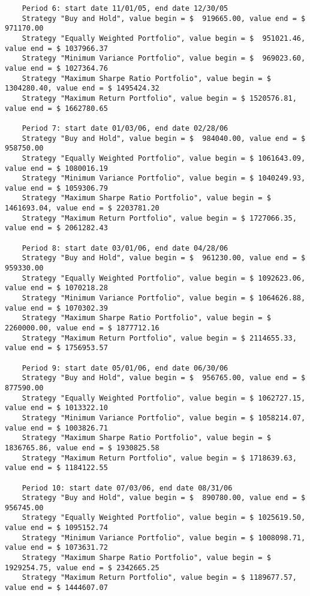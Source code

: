 \documentclass[english]{scrartcl}
\begin{document}
\begin{verbatim}
	Period 6: start date 11/01/05, end date 12/30/05
	Strategy "Buy and Hold", value begin = $  919665.00, value end = $  971170.00
	Strategy "Equally Weighted Portfolio", value begin = $  951021.46, value end = $ 1037966.37
	Strategy "Minimum Variance Portfolio", value begin = $  969023.60, value end = $ 1027364.76
	Strategy "Maximum Sharpe Ratio Portfolio", value begin = $ 1304280.40, value end = $ 1495424.32
	Strategy "Maximum Return Portfolio", value begin = $ 1520576.81, value end = $ 1662780.65
	
	Period 7: start date 01/03/06, end date 02/28/06
	Strategy "Buy and Hold", value begin = $  984040.00, value end = $  958750.00
	Strategy "Equally Weighted Portfolio", value begin = $ 1061643.09, value end = $ 1080016.19
	Strategy "Minimum Variance Portfolio", value begin = $ 1040249.93, value end = $ 1059306.79
	Strategy "Maximum Sharpe Ratio Portfolio", value begin = $ 1461693.04, value end = $ 2203781.20
	Strategy "Maximum Return Portfolio", value begin = $ 1727066.35, value end = $ 2061282.43
	
	Period 8: start date 03/01/06, end date 04/28/06
	Strategy "Buy and Hold", value begin = $  961230.00, value end = $  959330.00
	Strategy "Equally Weighted Portfolio", value begin = $ 1092623.06, value end = $ 1070218.28
	Strategy "Minimum Variance Portfolio", value begin = $ 1064626.88, value end = $ 1070302.39
	Strategy "Maximum Sharpe Ratio Portfolio", value begin = $ 2260000.00, value end = $ 1877712.16
	Strategy "Maximum Return Portfolio", value begin = $ 2114655.33, value end = $ 1756953.57
	
	Period 9: start date 05/01/06, end date 06/30/06
	Strategy "Buy and Hold", value begin = $  956765.00, value end = $  877590.00
	Strategy "Equally Weighted Portfolio", value begin = $ 1062727.15, value end = $ 1013322.10
	Strategy "Minimum Variance Portfolio", value begin = $ 1058214.07, value end = $ 1003826.71
	Strategy "Maximum Sharpe Ratio Portfolio", value begin = $ 1836765.86, value end = $ 1930825.58
	Strategy "Maximum Return Portfolio", value begin = $ 1718639.63, value end = $ 1184122.55
	
	Period 10: start date 07/03/06, end date 08/31/06
	Strategy "Buy and Hold", value begin = $  890780.00, value end = $  956745.00
	Strategy "Equally Weighted Portfolio", value begin = $ 1025619.50, value end = $ 1095152.74
	Strategy "Minimum Variance Portfolio", value begin = $ 1008098.71, value end = $ 1073631.72
	Strategy "Maximum Sharpe Ratio Portfolio", value begin = $ 1929254.75, value end = $ 2342665.25
	Strategy "Maximum Return Portfolio", value begin = $ 1189677.57, value end = $ 1444607.07
	

\end{verbatim}
\end{document}
